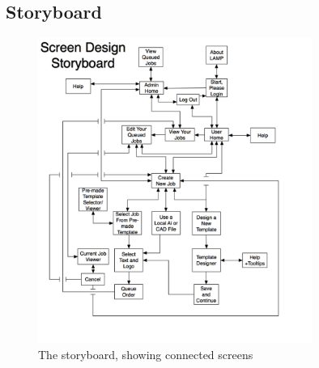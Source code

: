 \documentclass[oneside,openany,11pt,a4paper]{report}
\begin{document}
\subsection{Storyboard}
\begin{figure}[H]
	\centering
\includegraphics[width=0.8\textwidth]{storyboard.png}
\caption{The storyboard, showing connected screens}
\end{figure}
\end{document}
